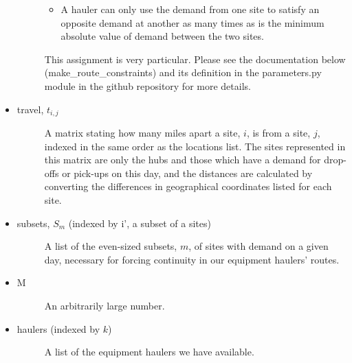 \documentclass[letterpaper,10pt,english]{sphinxmanual}
\begin{document}
\begin{itemize}
\begin{description}
\begin{itemize}
\item {} 
A hauler can only use the demand from one site to satisfy an
opposite demand at another as many times as is the minimum absolute
value of demand between the two sites.

\end{itemize}

This assignment is very particular. Please see the documentation below
(make\_route\_constraints) and its definition in the parameters.py module
in the github repository for more details.

\end{description}

\item {} \begin{description}
\item[{travel, \(t_{i,j}\)}] \leavevmode
A matrix stating how many miles apart a site, \(i\), is from a
site, \(j\), indexed in the same order as the locations list.
The sites represented in this matrix are only the hubs and those
which have a demand for drop-offs or pick-ups on this day, and the
distances are calculated by converting the differences in
geographical coordinates listed for each site.

\end{description}

\item {} \begin{description}
\item[{subsets, \(S_{m}\) (indexed by i', a subset of a sites)}] \leavevmode
A list of the even-sized subsets, \(m\), of sites with demand on a
given day, necessary for forcing continuity in our equipment haulers'
routes.

\end{description}

\item {} \begin{description}
\item[{M}] \leavevmode
An arbitrarily large number.

\end{description}

\item {} \begin{description}
\item[{haulers (indexed by \(k\))}] \leavevmode
A list of the equipment haulers we have available.

\end{description}

\end{itemize}
\end{document}

